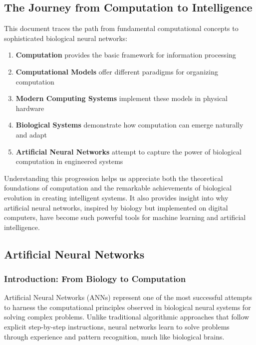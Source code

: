 \subsection{The Journey from Computation to Intelligence}
\label{subsec:journey-computation-intelligence}

This document traces the path from fundamental computational concepts to sophisticated biological neural networks:

\begin{enumerate}
\item \textbf{Computation} provides the basic framework for information processing
\item \textbf{Computational Models} offer different paradigms for organizing computation
\item \textbf{Modern Computing Systems} implement these models in physical hardware
\item \textbf{Biological Systems} demonstrate how computation can emerge naturally and adapt
\item \textbf{Artificial Neural Networks} attempt to capture the power of biological computation in engineered systems
\end{enumerate}

Understanding this progression helps us appreciate both the theoretical foundations of computation and the remarkable achievements of biological evolution in creating intelligent systems. It also provides insight into why artificial neural networks, inspired by biology but implemented on digital computers, have become such powerful tools for machine learning and artificial intelligence.

\subsection{Artificial Neural Networks}
\label{subsec:artificial-neural-networks}

\subsubsection{Introduction: From Biology to Computation}
\label{subsubsec:biology-to-computation}

Artificial Neural Networks (ANNs) represent one of the most successful attempts to harness the computational principles observed in biological neural systems for solving complex problems. Unlike traditional algorithmic approaches that follow explicit step-by-step instructions, neural networks learn to solve problems through experience and pattern recognition, much like biological brains.

